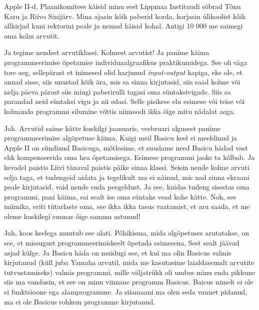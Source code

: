 
Apple II-d. Plaanikomitees käisid minu eest Lippmaa 
Instituudi sõbrad Tõnu Karu ja Riivo 
Sinijärv. Mina ajasin kõik paberid korda, korjasin 
ülikoolist kõik allkirjad kuni rektorini peale ja nemad käisid kohal. Antigi 10 
000 me saimegi oma kolm arvutit.

Ja tegime nendest arvutiklassi. Kolmest arvutist! Ja panime käima 
programmeerimise õpetamise individuaalgraafikus praktikumidega. See oli väga 
tore aeg, sellepärast et inimesed olid harjunud \emph{input-output} kapiga, eks 
ole, et annad sisse, siis unustad kõik ära, mis sa sinna kirjutasid, siis saad 
kolme või nelja päeva pärast siis mingi paberirulli tagasi oma süntaksivigade. 
Siis sa parandad neid süntaksi vigu ja nii edasi. Selle pisikese elu esimese 
või teise või kolmanda programmi silumine võttis niimoodi ikka õige mitu 
nädalat aega. 


Jah. Arvutid saime kätte kuskilgi jaanuaris, veebruari algusest panime  
programmeerimise algõpetuse käima. Kuigi meil Basicu keel ei 
meeldinud ja Apple II on sündinud Basicuga, mõtlesime, et 
suudame need Basicu hädad vast ehk kompenseerida oma hea õpetamisega. Esimese 
programmi jaoks ta kõlbab. Ja kevadel paistis Liivi tänaval paistis päike sinna klassi. Seisin nende kolme arvuti 
selja taga, et tudengeid aidata ja tegelikult ma ei näinud, mis nad sinna 
ekraani peale kirjutasid, vaid nende enda peegeldust. Ja see, kuidas tudeng 
sisestas oma programmi, pani käima, sai sealt ise oma süntaks vead kohe kätte. 
Noh, see miimika, eriti tütarlaste oma, see ikka ikka tasus vaatamist, et aru 
saada, et me oleme kuskilegi suunas õige sammu astunud! 


Jah, koos keelega muutub see alati. Põhikisma, mida algõpetuses arutatakse, on 
see, et missugust programmeerimiskeelt õpetada esimesena. Sest sealt jäävad 
asjad külge. Ja Basicu häda on muidugi see, et kui ma olin Basicus 
valmis kirjutanud (küll juba Yamaha arvutil, mida me kasutasime  laialdasemalt 
arvutite tutvustamiseks) valmis programmi, mille väljatrükk oli umbes minu enda 
pikkune siis ma vandusin, et see on minu viimane programm Basicus. Baicus 
nimelt ei ole ei funktsioone ega alamprogramme. Ja siiamaani ma olen seda 
vannet pidanud, ma ei ole Basicus rohkem programme kirjutanud. 

